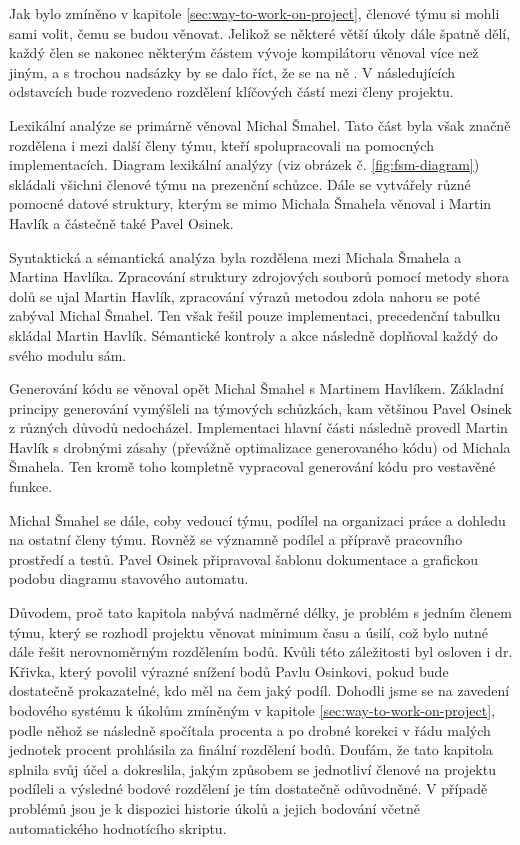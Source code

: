 \documentclass[11pt,a4paper]{article}
\begin{document}
Jak bylo zmíněno v kapitole \ref{sec:way-to-work-on-project}, členové týmu si mohli sami volit, čemu se budou věnovat. Jelikož se některé větší úkoly dále špatně dělí, každý člen se nakonec některým částem vývoje kompilátoru věnoval více než jiným, a s trochou nadsázky by se dalo říct, že se na ně . V následujících odstavcích bude rozvedeno rozdělení klíčových částí mezi členy projektu.

Lexikální analýze se primárně věnoval Michal Šmahel. Tato část byla však značně rozdělena i mezi další členy týmu, kteří spolupracovali na pomocných implementacích. Diagram lexikální analýzy (viz obrázek č. \ref{fig:fsm-diagram}) skládali všichni členové týmu na prezenční schůzce. Dále se vytvářely různé pomocné datové struktury, kterým se mimo Michala Šmahela věnoval i Martin Havlík a částečně také Pavel Osinek.

Syntaktická a sémantická analýza byla rozdělena mezi Michala Šmahela a Martina Havlíka. Zpracování struktury zdrojových souborů pomocí metody shora dolů se ujal Martin Havlík, zpracování výrazů metodou zdola nahoru se poté zabýval Michal Šmahel. Ten však řešil pouze implementaci, precedenční tabulku skládal Martin Havlík. Sémantické kontroly a akce následně doplňoval každý do svého modulu sám.

Generování kódu se věnoval opět Michal Šmahel s Martinem Havlíkem. Základní principy generování vymýšleli na týmových schůzkách, kam většinou Pavel Osinek z různých důvodů nedocházel. Implementaci hlavní části následně provedl Martin Havlík s drobnými zásahy (převážně optimalizace generovaného kódu) od Michala Šmahela. Ten kromě toho kompletně vypracoval generování kódu pro vestavěné funkce.

Michal Šmahel se dále, coby vedoucí týmu, podílel na organizaci práce a dohledu na ostatní členy týmu. Rovněž se významně podílel a přípravě pracovního prostředí a testů. Pavel Osinek připravoval šablonu dokumentace a grafickou podobu diagramu stavového automatu.

Důvodem, proč tato kapitola nabývá nadměrné délky, je problém s jedním členem týmu, který se rozhodl projektu věnovat minimum času a úsilí, což bylo nutné dále řešit nerovnoměrným rozdělením bodů. Kvůli této záležitosti byl osloven i dr. Křivka, který povolil výrazné snížení bodů Pavlu Osinkovi, pokud bude dostatečně prokazatelné, kdo měl na čem jaký podíl. Dohodli jsme se na zavedení bodového systému k úkolům zmíněným v kapitole \ref{sec:way-to-work-on-project}, podle něhož se následně spočítala procenta a po drobné korekci v řádu malých jednotek procent prohlásila za finální rozdělení bodů. Doufám, že tato kapitola splnila svůj účel a dokreslila, jakým způsobem se jednotliví členové na projektu podíleli a výsledné bodové rozdělení je tím dostatečně odůvodněné. V případě problémů jsou je k dispozici historie úkolů a jejich bodování včetně automatického hodnotícího skriptu.
\end{document}
